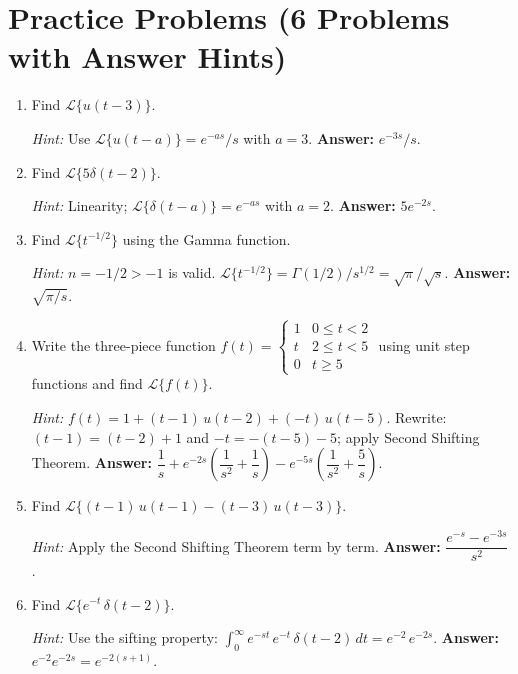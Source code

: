 \documentclass[12pt,a4paper]{article}
\begin{document}
\section{Practice Problems (6 Problems with Answer Hints)}

\begin{enumerate}

\item Find $\mathcal{L}\{u(t-3)\}$.

  \textit{Hint:} Use $\mathcal{L}\{u(t-a)\} = e^{-as}/s$ with $a = 3$.
  \textbf{Answer:} $e^{-3s}/s$.

\item Find $\mathcal{L}\{5\delta(t-2)\}$.

  \textit{Hint:} Linearity; $\mathcal{L}\{\delta(t-a)\} = e^{-as}$ with $a = 2$.
  \textbf{Answer:} $5e^{-2s}$.

\item Find $\mathcal{L}\{t^{-1/2}\}$ using the Gamma function.

  \textit{Hint:} $n = -1/2 > -1$ is valid.
  $\mathcal{L}\{t^{-1/2}\} = \Gamma(1/2)/s^{1/2} = \sqrt{\pi}/\sqrt{s}$.
  \textbf{Answer:} $\sqrt{\pi/s}$.

\item Write the three-piece function
  $f(t) = \begin{cases} 1 & 0 \leq t < 2 \\ t & 2 \leq t < 5 \\ 0 & t \geq 5\end{cases}$
  using unit step functions and find $\mathcal{L}\{f(t)\}$.

  \textit{Hint:} $f(t) = 1 + (t-1)\,u(t-2) + (-t)\,u(t-5)$.
  Rewrite: $(t-1) = (t-2) + 1$ and $-t = -(t-5) - 5$; apply Second Shifting Theorem.
  \textbf{Answer:}
  $\dfrac{1}{s} + e^{-2s}\!\left(\dfrac{1}{s^2} + \dfrac{1}{s}\right)
  - e^{-5s}\!\left(\dfrac{1}{s^2} + \dfrac{5}{s}\right)$.

\item Find $\mathcal{L}\{(t-1)\,u(t-1) - (t-3)\,u(t-3)\}$.

  \textit{Hint:} Apply the Second Shifting Theorem term by term.
  \textbf{Answer:} $\dfrac{e^{-s} - e^{-3s}}{s^2}$.

\item Find $\mathcal{L}\{e^{-t}\,\delta(t-2)\}$.

  \textit{Hint:} Use the sifting property:
  $\int_0^{\infty} e^{-st}\,e^{-t}\,\delta(t-2)\,dt = e^{-2}\,e^{-2s}$.
  \textbf{Answer:} $e^{-2}e^{-2s} = e^{-2(s+1)}$.

\end{enumerate}
\end{document}
